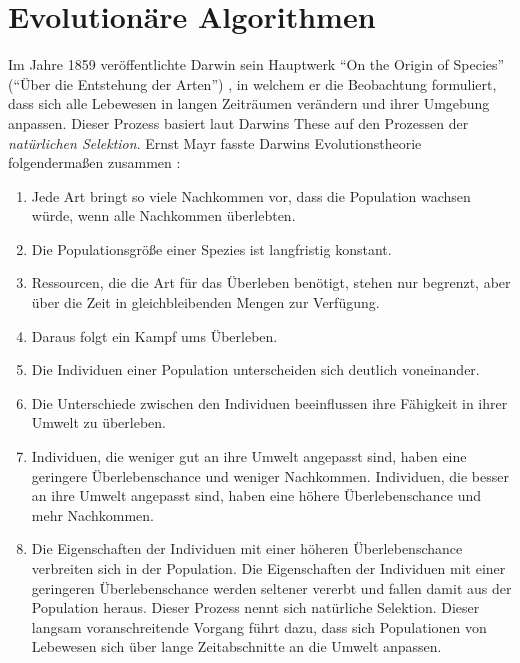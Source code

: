 \chapter{Evolutionäre Algorithmen}
Im Jahre 1859 veröffentlichte Darwin sein Hauptwerk "`On the Origin of Species"' ("`Über die Entstehung der Arten"') \cite{Darwin:1}, in welchem er die Beobachtung formuliert, dass sich alle Lebewesen in langen Zeiträumen verändern und ihrer Umgebung anpassen. Dieser Prozess basiert laut Darwins These auf den Prozessen der \textit{natürlichen Selektion}. Ernst Mayr fasste Darwins Evolutionstheorie folgendermaßen zusammen \cite{Mayr:1}: 

\begin{enumerate}
	\item Jede Art bringt so viele Nachkommen vor, dass die Population wachsen würde, wenn alle Nachkommen überlebten.
	\item Die Populationsgröße einer Spezies ist langfristig konstant. 
	\item Ressourcen, die die Art für das Überleben benötigt, stehen nur begrenzt, aber über die Zeit in gleichbleibenden Mengen zur Verfügung. 
	\item Daraus folgt ein Kampf ums Überleben. 
	\item Die Individuen einer Population unterscheiden sich deutlich voneinander. 
	\item Die Unterschiede zwischen den Individuen beeinflussen ihre Fähigkeit in ihrer Umwelt zu überleben. 
	\item Individuen, die weniger gut an ihre Umwelt angepasst sind, haben eine geringere Überlebenschance und weniger Nachkommen. Individuen, die besser an ihre Umwelt angepasst sind, haben eine höhere Überlebenschance und mehr Nachkommen.
	\item Die Eigenschaften der Individuen mit einer höheren Überlebenschance verbreiten sich in der Population. Die Eigenschaften der Individuen mit einer geringeren Überlebenschance werden seltener vererbt und fallen damit aus der Population heraus. Dieser Prozess nennt sich natürliche Selektion. Dieser langsam voranschreitende Vorgang führt dazu, dass sich Populationen von Lebewesen sich über lange Zeitabschnitte an die Umwelt anpassen. 
\end{enumerate}

